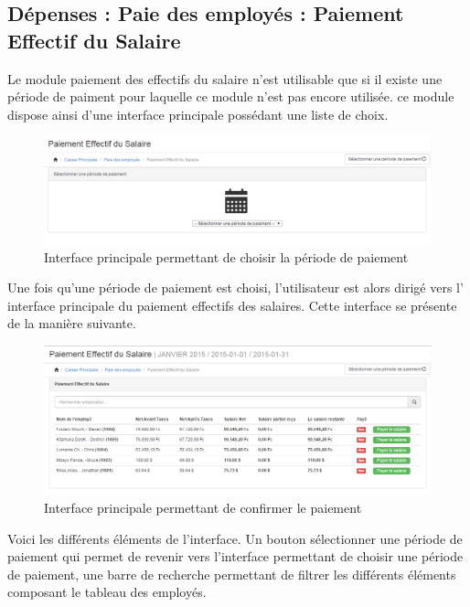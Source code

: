 \documentclass[12pt,a4paper]{report}
\begin{document}
\subsection{Dépenses : Paie des employés : Paiement Effectif du Salaire}
Le module paiement des effectifs du salaire n'est utilisable que si il existe une période de paiment pour laquelle ce module n'est pas encore utilisée. ce module dispose ainsi d'une interface principale possédant une liste de choix.

\begin{figure}[h]
\begin{center}
\includegraphics[width=14cm]{pic/selectPeriodPaiSal.png}
\end{center}
\caption{Interface principale permettant de choisir la période de paiement }
\label{Interface principale permettant de choisir la période de paiement }
\end{figure}

Une fois qu'une période de paiement est choisi, l'utilisateur est alors dirigé vers l' interface principale du paiement effectifs des salaires. Cette interface se présente de la manière suivante.

\begin{figure}[h]
\begin{center}
\includegraphics[width=14cm]{pic/paiementSalaire.png}
\end{center}
\caption{Interface principale permettant de confirmer le paiement}
\label{Interface principale permettant de confirmer le paiement}
\end{figure}


Voici les différents éléments de l'interface. Un bouton sélectionner une période de paiement qui permet de revenir vers l'interface permettant de choisir une période de paiement, une barre de recherche permettant de filtrer les différents éléments composant le tableau des employés.
\end{document}
